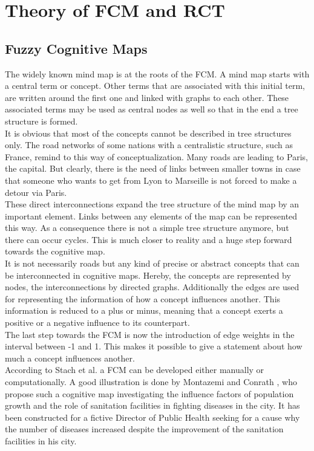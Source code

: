 \documentclass[conference]{IEEEtran}
\begin{document}
\section{Theory of FCM and RCT}
\subsection{Fuzzy Cognitive Maps}
The widely known mind map is at the roots of the FCM. A mind map starts with a central term or concept. Other terms that are associated with this initial term, are written around the first one and linked with graphs to each other. These associated terms may be used as central nodes as well so that in the end a tree structure is formed.\\
It is obvious that most of the concepts cannot be described in tree structures only. The road networks of some nations with a centralistic structure, such as France, remind to this way of conceptualization. Many roads are leading to Paris, the capital. But clearly, there is the need of links between smaller towns in case that someone who wants to get from Lyon to Marseille is not forced to make a detour via Paris.\\
These direct interconnections expand the tree structure of the mind map by an important element. Links between any elements of the map can be represented this way. As a consequence there is not a simple tree structure anymore, but there can occur cycles. This is much closer to reality and a huge step forward towards the cognitive map.\\
It is not necessarily roads but any kind of precise or abstract concepts that can be interconnected in cognitive maps. Hereby, the concepts are represented by nodes, the interconnections by directed graphs. Additionally the edges are used for representing the information of how a concept influences another. This information is reduced to a plus or minus, meaning that a concept exerts a positive or a negative influence to its counterpart.\\
The last step towards the FCM is now the introduction of edge weights in the interval between -1 and 1. This makes it possible to give a statement about how much a concept influences another.\\
According to Stach et al. \cite{stach2005} a FCM can be developed either manually or computationally. A good illustration is done by Montazemi and Conrath \cite{montazemi1986}, who propose such a cognitive map investigating the influence factors of population growth and the role of sanitation facilities in fighting diseases in the city. It has been constructed for a fictive Director of Public Health seeking for a cause why the number of diseases increased despite the improvement of the sanitation facilities in his city.
\end{document}
